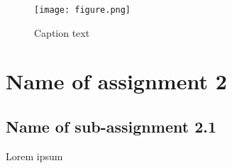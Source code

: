 \documentclass{article}
\begin{document}
\begin{figure}[h!] %
 	\begin{center}
 		\texttt{[image: figure.png]} %
 		\caption{Caption text}
 		\label{fig:figureLabelName}
 	\end{center}
\end{figure}

\section{Name of assignment 2}
\subsection{Name of sub-assignment 2.1}
Lorem ipsum
\end{document}
